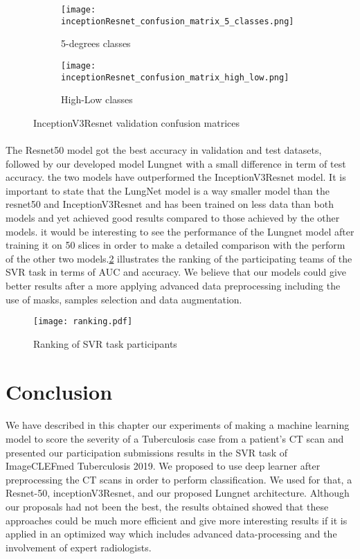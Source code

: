 \begin{figure}[h!]
\centering
  \begin{subfigure}[b]{0.4\linewidth}
    \texttt{[image: inceptionResnet\_confusion\_matrix\_5\_classes.png]}
    \caption{5-degrees classes}
  \end{subfigure}
  \begin{subfigure}[b]{0.4\linewidth}
    \texttt{[image: inceptionResnet\_confusion\_matrix\_high\_low.png]}
    \caption{High-Low classes}
  \end{subfigure}
\label{InceptionV3Resnet_conf_mat}
\caption{InceptionV3Resnet validation confusion matrices }
\end{figure}
\newpage
\paragraph{}
The Resnet50 model got the best accuracy in validation and test datasets, followed by our developed model Lungnet with a small difference in term of test accuracy. the two models have outperformed the InceptionV3Resnet model. It is important to state that the LungNet model is a way smaller model than the resnet50 and InceptionV3Resnet and has been trained on less data than both models and yet achieved good results compared to those achieved by the other models. it would be interesting to see the performance of the Lungnet model after training it on  50 slices in order to make a detailed comparison with the perform of the other two models.\ref{fig:ranking} illustrates the ranking of the participating teams of the SVR task in terms of AUC and accuracy. We believe that our models could give better results after a more applying advanced data preprocessing including the use of masks, samples selection and data augmentation.
\begin{figure}[h!]
\texttt{[image: ranking.pdf]}
\caption{Ranking of SVR task participants } 
\label{fig:ranking}
\end{figure}

\section{Conclusion}
\paragraph{}
We have described in this chapter our experiments of making a machine learning model to score the severity of a Tuberculosis case from a patient's CT scan and presented our participation submissions results in the SVR task of ImageCLEFmed Tuberculosis 2019. We proposed to use deep learner after preprocessing the CT scans in order to perform classification. We used for that, a Resnet-50, inceptionV3Resnet, and our proposed Lungnet architecture. Although our proposals had not been the best, the results obtained showed that these approaches could be much more efficient and give more interesting results if it is applied in an optimized way which includes advanced data-processing and the involvement of expert radiologists.
